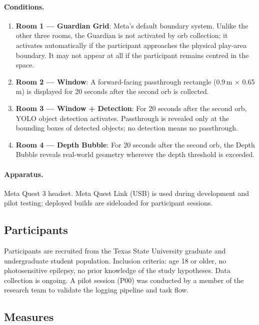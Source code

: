\documentclass{styling/vgtc} %
\begin{document}
\paragraph{Conditions.}
\begin{enumerate}
  \item \textbf{Room 1 — Guardian Grid}: Meta's default boundary system.
    Unlike the other three rooms, the Guardian is not activated by orb
    collection; it activates automatically if the participant approaches
    the physical play-area boundary. It may not appear at all if the
    participant remains centred in the space.
  \item \textbf{Room 2 — Window}: A forward-facing passthrough rectangle
    (0.9\,m $\times$ 0.65\,m) is displayed for 20 seconds after the second
    orb is collected.
  \item \textbf{Room 3 — Window + Detection}: For 20 seconds after the
    second orb, YOLO object detection activates. Passthrough is revealed
    only at the bounding boxes of detected objects; no detection means no
    passthrough.
  \item \textbf{Room 4 — Depth Bubble}: For 20 seconds after the second
    orb, the Depth Bubble reveals real-world geometry wherever the depth
    threshold is exceeded.
\end{enumerate}

\paragraph{Apparatus.}
Meta Quest 3 headset. Meta Quest Link (USB) is used during development
and pilot testing; deployed builds are sideloaded for participant sessions.


\subsection{Participants}

Participants are recruited from the Texas State University graduate and
undergraduate student population. Inclusion criteria: age 18 or older,
no photosensitive epilepsy, no prior knowledge of the study hypotheses.
Data collection is ongoing. A pilot session (P00) was conducted by a
member of the research team to validate the logging pipeline and task
flow.

\subsection{Measures}
\end{document}
